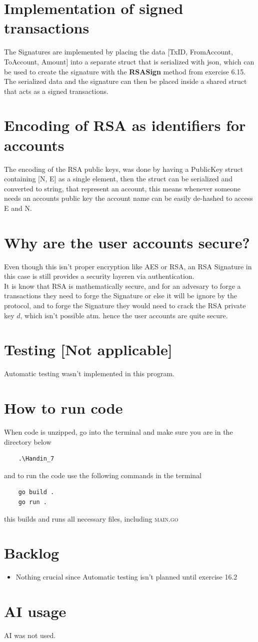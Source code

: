 \documentclass[12pt]{article}
\begin{document}
\section*{Implementation of signed transactions}
The Signatures are implemented by placing the data [TxID, FromAccount, ToAccount, Amount] into a separate struct that is serialized with json, which can be used to create the signature with the \textbf{RSASign} method from exercise 6.15.\\
The serialized data and the signature can then be placed inside a shared struct that acts as a signed transactions.\\
\section*{Encoding of RSA as identifiers for accounts}
The encoding of the RSA public keys, was done by having a PublicKey struct containing [N, E] as a single element, then the struct can be serialized and converted to string, that represent an account, this means whenever someone needs an accounts public key the account name can be easily de-hashed to access E and N.
\section*{Why are the user accounts secure?}
Even though this isn't proper encryption like AES or RSA, an RSA Signature in this case is still provides a security layeren via authentication.\\
It is know that RSA is mathematically secure, and for an advesary to forge a transactions they need to forge the Signature or else it will be ignore by the protocol, and to forge the Signature they would need to crack the RSA private key $d$, which isn't possible atm. hence the user accounts are quite secure.
\section*{Testing [Not applicable]}
    Automatic testing wasn't implemented in this program.


\section*{How to run code}
When code is unzipped, go into the terminal and make sure you are in the directory below
\begin{lstlisting}
    .\Handin_7
\end{lstlisting}
and to run the code use the following commands in the terminal
\begin{lstlisting}
    go build .
    go run .
\end{lstlisting}
this builds and runs all necessary files, including \textsc{main.go}
\section*{Backlog}
\begin{itemize}
    \item Nothing crucial since Automatic testing isn't planned until exercise 16.2
\end{itemize}

\section*{AI usage}
AI was not used.
\printbibliography
\end{document}
